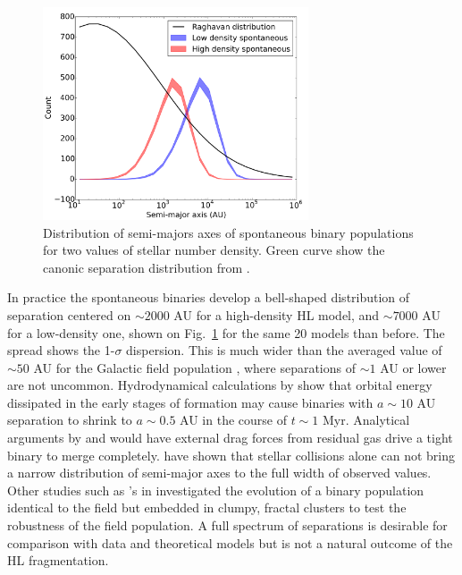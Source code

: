 \begin{figure}
\begin{center}
\includegraphics[width=0.7\textwidth]{Figures/5_spontaneous_smaxis}
\caption{Distribution of semi-majors axes of spontaneous binary populations for two values of stellar number density. Green curve show the canonic separation distribution from \protect\cite{Raghavan2010}. }
\label{Fig:5_spontaneous_smaxis}
\end{center}
\end{figure}


In practice the spontaneous binaries develop a bell-shaped  distribution of separation centered on $\sim 2000$ AU for a high-density HL model,  and $\sim 7000$ AU for a low-density one, shown on Fig.~\ref{Fig:5_spontaneous_smaxis} for the same 20 models than before. The spread shows the 1-$\sigma$ dispersion. This is much wider than the averaged value of $\sim 50$ AU for the Galactic field population \citep{DM91,Raghavan2010}, where separations of $\sim 1 $ AU or lower are not uncommon. Hydrodynamical calculations by \cite{Bate2012} show that orbital energy dissipated in the early stages of formation may cause binaries with $ a \sim 10 $ AU  separation to shrink to $ a \sim  0.5 $ AU in the course of $t \sim 1 $ Myr. Analytical arguments by \cite{Stahler2010} and \cite{Korntreff2012} would have external drag forces from residual gas drive a tight binary to merge completely. \cite{Kroupa2001} have shown that stellar collisions  alone can not bring a narrow distribution of semi-major axes to the full width of observed values. Other studies such as \citeauthor{Parker2014}'s in \citeyear{Parker2014} investigated the evolution of a binary population identical to the field but embedded in clumpy, fractal clusters \citep{Goodwin2004} to test the robustness of the field population. 
A full spectrum of separations is desirable for comparison with data and theoretical models but is not a  natural outcome of the HL fragmentation. 

